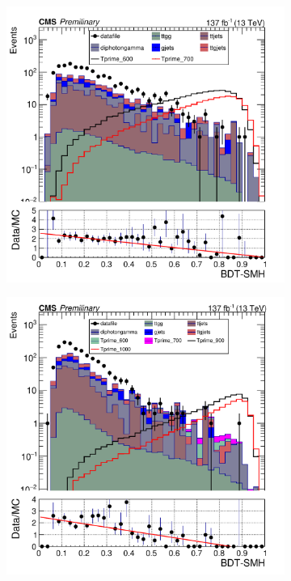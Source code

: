 \begin{figure}[H]
     \centering
     \begin{subfigure}[b]{0.3\textwidth}
         \centering
         \includegraphics[width=\textwidth]{BDT_Output/Stacked_plot_BDT_600-700_with_diphoton_cuts_inputs.pdf}
         \label{fig:y equals x}
     \end{subfigure}
     \hfill
     \begin{subfigure}[b]{0.3\textwidth}
         \centering
         \includegraphics[width=\textwidth]{BDT_Output/Stacked_plot_BDT_800-1000_with_diphoton_cuts_inputs.pdf}
         

\end{subfigure}
\end{figure}
